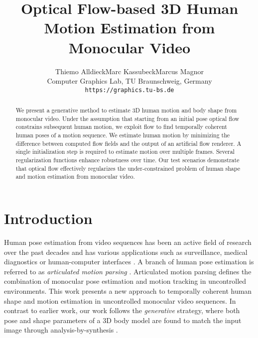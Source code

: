 \documentclass[10pt,twocolumn,letterpaper]{article}
\begin{document}
\sloppy
	\title{Optical Flow-based 3D Human Motion Estimation from Monocular Video}
	
	\author{Thiemo Alldieck\qquad Marc Kassubeck\qquad Marcus Magnor 		\vspace{0.5em} 
		\\ Computer Graphics Lab, TU Braunschweig, Germany\\
		{\tt\small https://graphics.tu-bs.de}
	}
	
	\maketitle

%
\begin{abstract}
	We present a generative method to estimate 3D human motion and body shape from monocular video. Under the assumption that starting from an initial pose optical flow constrains subsequent human motion, we exploit flow to find temporally coherent human poses of a motion sequence. We estimate human motion by minimizing the difference between computed flow fields and the output of an artificial flow renderer. A single initialization step is required to estimate motion over multiple frames. Several regularization functions enhance robustness over time. Our test scenarios demonstrate that optical flow effectively regularizes the under-constrained problem of human shape and motion estimation from monocular video.
\end{abstract}
%
%
\section{Introduction}
\label{sec:intro}

Human pose estimation from video sequences has been an active field of research over the past decades and has various applications such as surveillance, medical diagnostics or human-computer interfaces \cite{moeslund2006survey}. A branch of human pose estimation is referred to as \textit{articulated motion parsing} \cite{zuffi2013estimating}. Articulated motion parsing defines the combination of monocular pose estimation and motion tracking in uncontrolled environments. This work presents a new approach to temporally coherent human shape and motion estimation in uncontrolled monocular video sequences. In contrast to earlier work, our work follows the \textit{generative} strategy, where both pose and shape parameters of a 3D body model are found to match the input image through analysis-by-synthesis \cite{magnor2015digital}.
\end{document}
